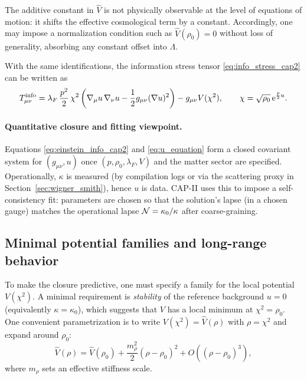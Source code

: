 \begin{remark}
\label{rem:V_normalization}
The additive constant in $\widehat V$ is not physically observable at the level of equations of motion: it shifts the effective cosmological term by a constant.
Accordingly, one may impose a normalization condition such as $\widehat V(\rho_0)=0$ without loss of generality, absorbing any constant offset into $\Lambda$.
\end{remark}

\begin{proposition}
\label{prop:info_stress_u}
With the same identifications, the information stress tensor \eqref{eq:info_stress_cap2} can be written as
\begin{equation}
  T^{\mathrm{info}}_{\mu\nu}
  = \lambda_F\,\frac{p^2}{2}\,\chi^2
  \left(\nabla_\mu u\,\nabla_\nu u-\frac12 g_{\mu\nu}(\nabla u)^2\right)
  - g_{\mu\nu}V(\chi^2),
  \qquad \chi=\sqrt{\rho_0}\,\mathrm{e}^{\frac{p}{2}u}.
  \label{eq:info_stress_u}
\end{equation}
\end{proposition}

\paragraph{Quantitative closure and fitting viewpoint.}
Equations \eqref{eq:einstein_info_cap2} and \eqref{eq:u_equation} form a closed covariant system for $(g_{\mu\nu},u)$ once $(p,\rho_0,\lambda_F,V)$ and the matter sector are specified.
Operationally, $\kappa$ is measured (by compilation logs or via the scattering proxy in Section~\ref{sec:wigner_smith}), hence $u$ is data.
CAP-II uses this to impose a self-consistency fit: parameters are chosen so that the solution's lapse (in a chosen gauge) matches the operational lapse $\mathcal{N}=\kappa_0/\kappa$ after coarse-graining.

\subsection{Minimal potential families and long-range behavior}
\label{subsec:potential_families}

To make the closure predictive, one must specify a family for the local potential $V(\chi^2)$.
A minimal requirement is \emph{stability} of the reference background $u=0$ (equivalently $\kappa=\kappa_0$), which suggests that $V$ has a local minimum at $\chi^2=\rho_0$.
One convenient parametrization is to write $V(\chi^2)=\widehat V(\rho)$ with $\rho=\chi^2$ and expand around $\rho_0$:
\begin{equation}
  \widehat V(\rho)
  = \widehat V(\rho_0) + \frac{m_\rho^2}{2}(\rho-\rho_0)^2 + O\!\left((\rho-\rho_0)^3\right),
  \label{eq:V_rho_expansion}
\end{equation}
where $m_\rho$ sets an effective stiffness scale.

